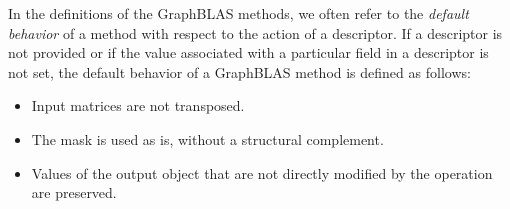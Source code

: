 In the definitions of the GraphBLAS methods, we often refer to the \emph{default behavior} of a method with 
respect to the action of a descriptor.   If a descriptor is not provided or if the value associated with a particular field in a descriptor 
is not set, the default behavior of a GraphBLAS method is defined as follows:
\begin{itemize}
\item Input matrices are not transposed.
\item The mask is used as is, without a structural complement.
\item Values of the output object that are not directly modified by the operation are preserved.
\end{itemize}

